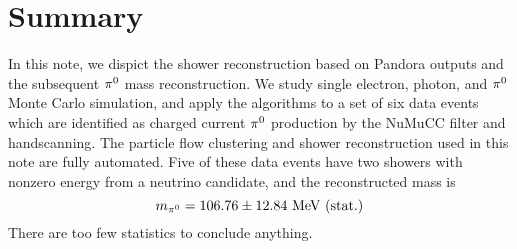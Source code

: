 \section{Summary}
\label{sec:summary}

In this note, we dispict the shower reconstruction based on Pandora
outputs and the subsequent ${\pi}^0$ mass reconstruction.
We study single electron, photon, and ${\pi}^0$ Monte Carlo
simulation, and apply the algorithms to a set of six data events
which are identified as charged current ${\pi}^0$ production
by the NuMuCC filter and handscanning.
The particle flow clustering and 
shower reconstruction used in 
this note are fully automated.
Five of these data events have two showers with nonzero energy
from a neutrino candidate, and the reconstructed mass is
\begin{equation}
\label{eq:pi0_mass_result}
m_{{\pi}^0} = 106.76\pm 12.84~\mbox{MeV (stat.)}
\end{equation}
There are too few statistics to conclude anything.
